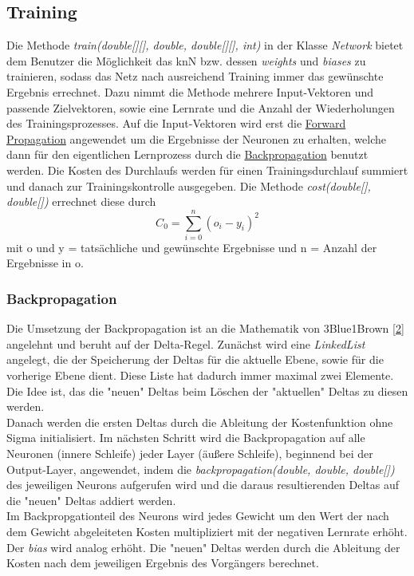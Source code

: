 \documentclass[paper=A4,pagesize=auto,12pt,headinclude=true,footinclude=true,BCOR=0mm,DIV=calc]{scrartcl}
\begin{document}
\subsection{Training}
Die Methode \textit{train(double[][], double, double[][], int)} in der Klasse \textit{Network} bietet dem Benutzer die Möglichkeit das knN bzw. dessen \textit{weights} und \textit{biases} zu trainieren, sodass das Netz nach ausreichend Training immer das gewünschte Ergebnis errechnet. Dazu nimmt die Methode mehrere Input-Vektoren und passende Zielvektoren, sowie eine Lernrate und die Anzahl der Wiederholungen des Trainingsprozesses. Auf die Input-Vektoren wird erst die \hyperlink{forwardprop}{Forward Propagation} angewendet um die Ergebnisse der Neuronen zu erhalten, welche dann für den eigentlichen Lernprozess durch die \hyperlink{backprop}{Backpropagation} benutzt werden. Die Kosten des Durchlaufs werden für einen Trainingsdurchlauf summiert und danach zur Trainingskontrolle ausgegeben. Die Methode \textit{cost(double[], double[])} errechnet diese durch
\begin{equation}
	C_0 = \sum_{i=0}^{n} (o_{i} - y_{i})^2
\end{equation}
\cite{3b1b} mit o und y = tatsächliche und gewünschte Ergebnisse und n = Anzahl der Ergebnisse in o.


\hypertarget{backprop}{\subsubsection{Backpropagation}}
Die Umsetzung der Backpropagation ist an die Mathematik von 3Blue1Brown \hyperlink{2}{[2]} angelehnt und beruht auf der Delta-Regel. Zunächst wird eine \textit{LinkedList} angelegt, die der Speicherung der Deltas für die aktuelle Ebene, sowie für die vorherige Ebene dient. Diese Liste hat dadurch immer maximal zwei Elemente. Die Idee ist, das die "neuen" Deltas beim Löschen der "aktuellen" Deltas zu diesen werden.\\Danach werden die ersten Deltas durch die Ableitung der Kostenfunktion ohne Sigma initialisiert. Im nächsten Schritt wird die Backpropagation auf alle Neuronen (innere Schleife) jeder Layer (äußere Schleife), beginnend bei der Output-Layer, angewendet, indem die \textit{backpropagation(double, double, double[])} des jeweiligen Neurons aufgerufen wird und die daraus resultierenden Deltas auf die "neuen" Deltas addiert werden.\\Im Backpropgationteil des Neurons wird jedes Gewicht um den Wert der nach dem Gewicht abgeleiteten Kosten multipliziert mit der negativen Lernrate erhöht. Der \textit{bias} wird analog erhöht. Die "neuen" Deltas werden durch die Ableitung der Kosten nach dem jeweiligen Ergebnis des Vorgängers berechnet.
\end{document}
